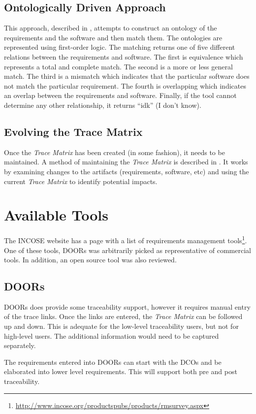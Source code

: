 \documentclass[10pt, openany]{report}
\newcommand{\trace}{\emph{Trace Matrix}}
\begin{document}
\subsection{Ontologically Driven Approach}
This approach, described in \cite{req10}, attempts to construct an ontology of the requirements and the software and then match them.  The ontologies are represented using first-order logic.  The matching returns one of five different relations between the requirements and software.  The first is equivalence which represents a total and complete match.  The second is a more or less general match.  The third is a mismatch which indicates that the particular software does not match the particular requirement.  The fourth is overlapping which indicates an overlap between the requirements and software.  Finally, if the tool cannot determine any other relationship, it returns ``idk'' (I don't know).

\subsection{Evolving the Trace Matrix}
Once the \trace{} has been created (in some fashion), it needs to be maintained.  A method of maintaining the \trace{} is described in \cite{req11}.  It works by examining changes to the artifacts (requirements, software, etc) and using the current \trace{} to identify potential impacts.

\section{Available Tools}
The INCOSE website has a page with a list of requirements management tools\footnote{\url{http://www.incose.org/productspubs/products/rmsurvey.aspx}}.  One of these tools, DOORs was arbitrarily picked as representative of commercial tools.  In addition, an open source tool was also reviewed.

\subsection{DOORs}
DOORs does provide some traceability support\cite{req8}, however it requires manual entry of the trace links.  Once the links are entered, the \trace{} can be followed up and down.  This is adequate for the low-level traceability users\cite{req2}, but not for high-level users.  The additional information would need to be captured separately.

The requirements entered into DOORs can start with the DCOs and be elaborated into lower level requirements.  This will support both pre and post traceability\cite{req5}.
\end{document}
